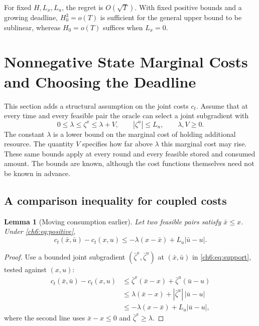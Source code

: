 \documentclass[11pt]{article}
\theoremstyle{plain}
\newtheorem{Thm:Lemma}[Thm:Theorem]{Lemma}
\theoremstyle{remark}
\numberwithin{equation}{section}
\begin{document}
For fixed $H,L_x,L_u$, the regret is $O(\sqrt T)$. With fixed positive
bounds and a growing deadline, $H_0^3=o(T)$ is sufficient for the general
upper bound to be sublinear, whereas $H_0=o(T)$ suffices when $L_x=0$.

\section{Nonnegative State Marginal Costs and Choosing the Deadline}
\label{ch6:sec:positive}
This section adds a structural assumption on the joint costs $c_t$.
Assume that at every time
and every feasible pair the oracle can select a joint subgradient with
\begin{equation}\label{ch6:eq:positive}
 0\le\lambda\le\zeta^x\le\lambda+V,\qquad |\zeta^u|\le L_u,
 \qquad \lambda,V\ge0.
\end{equation}
The constant $\lambda$ is a lower bound on the marginal cost of holding
additional resource. The quantity $V$ specifies how far above $\lambda$
this marginal cost may rise. These same bounds apply at every round and
every feasible stored and consumed amount. The bounds are known,
although the cost functions themselves need not be known in advance.

\subsection{A comparison inequality for coupled costs}
\begin{Thm:Lemma}[Moving consumption earlier]\label{ch6:lem:earlier}
Let two feasible pairs satisfy $\bar x\le x$. Under \eqref{ch6:eq:positive},
\begin{equation}\label{ch6:eq:earlier}
 c_t(\bar x,\bar u)-c_t(x,u)
 \le-\lambda(x-\bar x)+L_u|\bar u-u|.
\end{equation}
\end{Thm:Lemma}
\begin{proof}
Use a bounded joint subgradient $(\bar\zeta^x,\bar\zeta^u)$ at
$(\bar x,\bar u)$ in \eqref{ch6:eq:support}, tested against $(x,u)$:
\begin{align*}
c_t(\bar x,\bar u)-c_t(x,u)
&\le\bar\zeta^x(\bar x-x)+\bar\zeta^u(\bar u-u)\\
&\le\lambda(\bar x-x)+|\bar\zeta^u|\,|\bar u-u|\\
&\le-\lambda(x-\bar x)+L_u|\bar u-u|,
\end{align*}
where the second line uses $\bar x-x\le0$ and
$\bar\zeta^x\ge\lambda$.
\end{proof}
\end{document}
